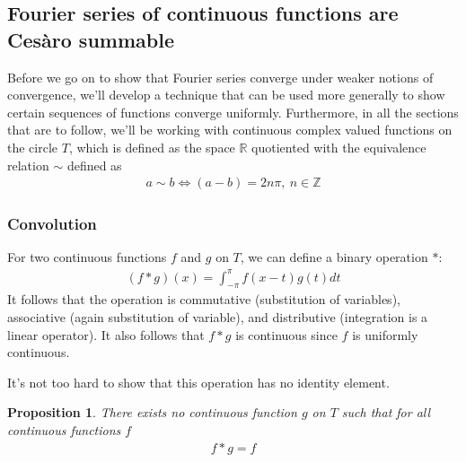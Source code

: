 \documentclass[12pt, titlepage]{article}
\newtheorem{prop}[thm]{Proposition}
\theoremstyle{definition}
\begin{document}
\subsection{Fourier series of continuous functions are Cesàro summable}
Before we go on to show that Fourier series converge under weaker notions of convergence, we'll develop a technique that can be used more generally to show certain sequences of functions converge uniformly. Furthermore, in all the sections that are to follow, we'll be working with continuous complex valued functions on the circle $T$, which is defined as the space $\mathbb{R}$ quotiented with the equivalence relation $\sim$ defined as
\begin{align*}
    a \sim b \iff (a-b) = 2n\pi,\ n \in \mathbb{Z}
\end{align*}

\subsubsection{Convolution}
For two continuous functions $f$ and $g$ on $T$, we can define a binary operation $\ast$:
\begin{align*}
    (f \ast g)(x) = \int_{-\pi}^{\pi} f(x-t) g(t) dt
\end{align*}
It follows that the operation is commutative (substitution of variables), associative (again substitution of variable), and distributive (integration is a linear operator). It also follows that $f \ast g$ is continuous since $f$ is uniformly continuous.

It's not too hard to show that this operation has no identity element.
\begin{prop}
    There exists no continuous function $g$ on $T$ such that for all continuous functions $f$
    \begin{align*}
        f \ast g = f
    \end{align*}
\end{prop}
\end{document}
